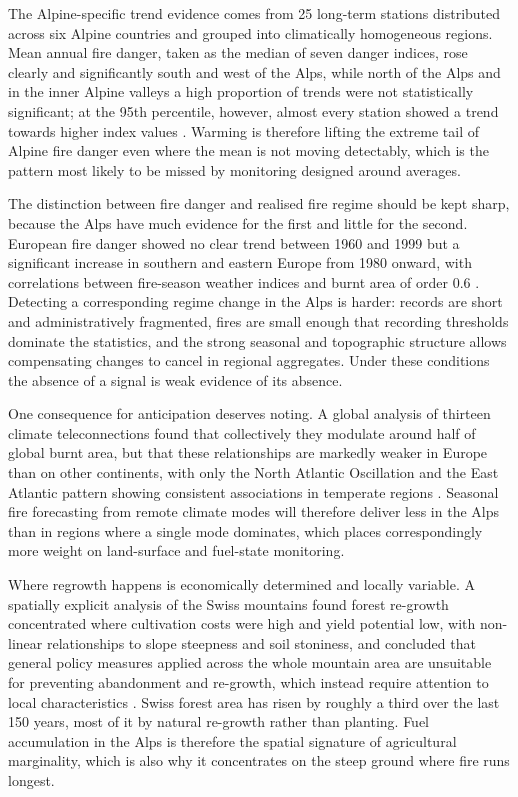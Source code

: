 \documentclass[11pt,a4paper]{article}
\begin{document}
The Alpine-specific trend evidence comes from 25 long-term stations distributed across six Alpine countries and grouped into climatically homogeneous regions. Mean annual fire danger, taken as the median of seven danger indices, rose clearly and significantly south and west of the Alps, while north of the Alps and in the inner Alpine valleys a high proportion of trends were not statistically significant; at the 95th percentile, however, almost every station showed a trend towards higher index values \citep{wastl_recent_2012}. Warming is therefore lifting the extreme tail of Alpine fire danger even where the mean is not moving detectably, which is the pattern most likely to be missed by monitoring designed around averages.

The distinction between fire danger and realised fire regime should be kept sharp, because the Alps have much evidence for the first and little for the second. European fire danger showed no clear trend between 1960 and 1999 but a significant increase in southern and eastern Europe from 1980 onward, with correlations between fire-season weather indices and burnt area of order 0.6 \citep{venalainen_temporal_2014}. Detecting a corresponding regime change in the Alps is harder: records are short and administratively fragmented, fires are small enough that recording thresholds dominate the statistics, and the strong seasonal and topographic structure allows compensating changes to cancel in regional aggregates. Under these conditions the absence of a signal is weak evidence of its absence.

One consequence for anticipation deserves noting. A global analysis of thirteen climate teleconnections found that collectively they modulate around half of global burnt area, but that these relationships are markedly weaker in Europe than on other continents, with only the North Atlantic Oscillation and the East Atlantic pattern showing consistent associations in temperate regions \citep{cardil_climate_2023}. Seasonal fire forecasting from remote climate modes will therefore deliver less in the Alps than in regions where a single mode dominates, which places correspondingly more weight on land-surface and fuel-state monitoring.

Where regrowth happens is economically determined and locally variable. A spatially explicit analysis of the Swiss mountains found forest re-growth concentrated where cultivation costs were high and yield potential low, with non-linear relationships to slope steepness and soil stoniness, and concluded that general policy measures applied across the whole mountain area are unsuitable for preventing abandonment and re-growth, which instead require attention to local characteristics \citep{gellrich_agricultural_2007}. Swiss forest area has risen by roughly a third over the last 150 years, most of it by natural re-growth rather than planting. Fuel accumulation in the Alps is therefore the spatial signature of agricultural marginality, which is also why it concentrates on the steep ground where fire runs longest.
\end{document}
